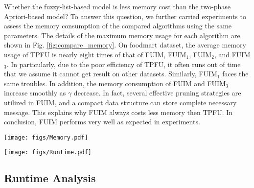 \documentclass[journal]{IEEEtran}
\begin{document}
Whether the fuzzy-list-based model is less memory cost than the two-phase Apriori-based model? To answer this question, we further carried experiments to assess the memory consumption of the compared algorithms using the same parameters. The details of the maximum memory usage for each algorithm are shown in Fig. \ref{fig:compare_memory}. On foodmart dataset, the average memory usage of TPFU is nearly eight times of that of FUIM, FUIM$_1$, FUIM$_2$, and FUIM$_3$. In particularly, due to the poor efficiency of TPFU, it often runs out of time that we assume it cannot get result on other datasets. Similarly, FUIM$_1$ faces the same troubles. In addition, the memory consumption of FUIM and FUIM$_{3}$ increase smoothly as $\gamma$ decrease. In fact, several effective pruning strategies are utilized in FUIM, and a compact data structure can store complete necessary message. This explains why FUIM always costs less memory then TPFU. In conclusion, FUIM performs very well as expected in experiments.


\begin{figure*}[!htbp]
	\centering
	\texttt{[image: figs/Memory.pdf]}
	\caption{The memory consumption.}
	\label{fig:compare_memory}
\end{figure*}


\begin{figure*}[!htbp]
	\centering
	\texttt{[image: figs/Runtime.pdf]}
	\caption{The runtime consumption.}
	\label{fig:compare_runtime}
\end{figure*}



\subsection{Runtime Analysis}
\end{document}
